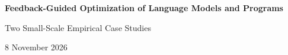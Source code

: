 \documentclass[11pt,a4paper]{article}
\begin{document}
\begin{center}
{\LARGE\bfseries\sffamily\color{inkblue} Feedback-Guided Optimization of Language Models and Programs\par}
\vspace{3mm}
{\large Two Small-Scale Empirical Case Studies\par}
\vspace{2mm}
{\small 8 November 2026}
\end{center}





\clearpage
\appendix

\end{document}
